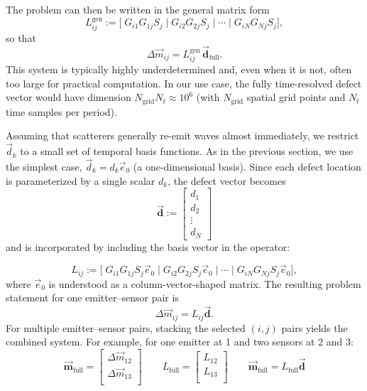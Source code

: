\documentclass[a4paper,fleqn]{cas-sc}
\begin{document}
The problem can then be written in the general matrix form
\begin{equation}
L^{\mathrm{gen}}_{ij} := \big[\; G_{i1} G_{1j} S_j \;\big|\; G_{i2} G_{2j} S_j \;\big|\; \cdots \;\big|\; G_{iN} G_{Nj} S_j \big],
\end{equation}
so that
\begin{equation}
\Delta \vec m_{ij} = L^{\mathrm{gen}}_{ij}\, \vec{\mathbf{d}}_{\mathrm{full}}.
\end{equation}
This system is typically highly underdetermined and, even when it is not, often too large for practical computation. In our use case, the fully time-resolved defect vector would have dimension $N_{\text{grid}} N_t \approx 10^6$ (with $N_{\text{grid}}$ spatial grid points and $N_t$ time samples per period).

Assuming that scatterers generally re-emit waves almost immediately, we restrict $\vec d_k$ to a small set of temporal basis functions. As in the previous section, we use the simplest case, $\vec{d}_k = d_k\vec{e}_0$ (a one-dimensional basis). Since each defect location is parameterized by a single scalar $d_k$, the defect vector becomes
\begin{equation}
\vec{\mathbf{d}} := \begin{bmatrix} d_1 \\ d_2 \\ \vdots \\ d_N \end{bmatrix}
\end{equation}
and is incorporated by including the basis vector in the operator:

\begin{equation}\label{L_Matrix_short}
L_{ij} := \big[\; G_{i1} G_{1j} S_j \vec e_0 \;\big|\; G_{i2} G_{2j} S_j \vec e_0 \;\big|\; \cdots \;\big|\; G_{iN} G_{Nj} S_j \vec e_0 \big],
\end{equation}
where $\vec{e}_0$ is understood as a column-vector-shaped matrix.
The resulting problem statement for one emitter--sensor pair is
\begin{equation}\label{partial_system}
\Delta \vec m_{ij} = L_{ij} \vec{\mathbf{d}}.
\end{equation}
For multiple emitter--sensor pairs, stacking the selected $(i,j)$ pairs yields the combined system. For example, for one emitter at 1 and two sensors at 2 and 3:
\begin{equation}\label{full_system}
\mathbf{ \vec m}_{\mathrm{full}} =
\begin{bmatrix}
\Delta \vec m_{1 2} \\
\Delta \vec m_{1 3} \\
\end{bmatrix}\qquad
L_{\mathrm{full}} =
\begin{bmatrix}
L_{1 2} \\
L_{1 3} \\
\end{bmatrix}
\qquad
\mathbf{\vec m}_{\mathrm{full}} = L_{\mathrm{full}} \vec{\mathbf{d}}
\end{equation}
\end{document}
